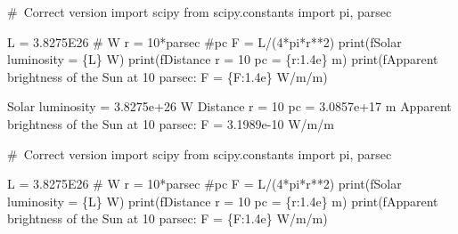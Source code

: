 \documentclass[
  letterpaper,
  DIV=11,
  numbers=noendperiod]{scrreprt}
\newenvironment{Shaded}{\begin{snugshade}}{\end{snugshade}}
\newcommand{\BuiltInTok}[1]{\textcolor[rgb]{0.00,0.23,0.31}{#1}}
\newcommand{\CommentTok}[1]{\textcolor[rgb]{0.37,0.37,0.37}{#1}}
\newcommand{\DecValTok}[1]{\textcolor[rgb]{0.68,0.00,0.00}{#1}}
\newcommand{\FloatTok}[1]{\textcolor[rgb]{0.68,0.00,0.00}{#1}}
\newcommand{\ImportTok}[1]{\textcolor[rgb]{0.00,0.46,0.62}{#1}}
\newcommand{\NormalTok}[1]{\textcolor[rgb]{0.00,0.23,0.31}{#1}}
\newcommand{\OperatorTok}[1]{\textcolor[rgb]{0.37,0.37,0.37}{#1}}
\newcommand{\SpecialCharTok}[1]{\textcolor[rgb]{0.37,0.37,0.37}{#1}}
\newcommand{\SpecialStringTok}[1]{\textcolor[rgb]{0.13,0.47,0.30}{#1}}
\begin{document}
\begin{Shaded}
\begin{Highlighting}[]
\CommentTok{\# Correct version}
\ImportTok{import}\NormalTok{ scipy}
\ImportTok{from}\NormalTok{ scipy.constants }\ImportTok{import}\NormalTok{ pi, parsec}

\NormalTok{L }\OperatorTok{=} \FloatTok{3.8275E26} \CommentTok{\# W}
\NormalTok{r }\OperatorTok{=} \DecValTok{10}\OperatorTok{*}\NormalTok{parsec }\CommentTok{\#pc}
\NormalTok{F }\OperatorTok{=}\NormalTok{ L}\OperatorTok{/}\NormalTok{(}\DecValTok{4}\OperatorTok{*}\NormalTok{pi}\OperatorTok{*}\NormalTok{r}\OperatorTok{**}\DecValTok{2}\NormalTok{)}
\BuiltInTok{print}\NormalTok{(}\SpecialStringTok{f\textquotesingle{}Solar luminosity = }\SpecialCharTok{\{}\NormalTok{L}\SpecialCharTok{\}}\SpecialStringTok{ W\textquotesingle{}}\NormalTok{)}
\BuiltInTok{print}\NormalTok{(}\SpecialStringTok{f\textquotesingle{}Distance r = 10 pc = }\SpecialCharTok{\{}\NormalTok{r}\SpecialCharTok{:1.4e\}}\SpecialStringTok{ m\textquotesingle{}}\NormalTok{)}
\BuiltInTok{print}\NormalTok{(}\SpecialStringTok{f\textquotesingle{}Apparent brightness of the Sun at 10 parsec: F = }\SpecialCharTok{\{}\NormalTok{F}\SpecialCharTok{:1.4e\}}\SpecialStringTok{ W/m/m\textquotesingle{}}\NormalTok{)}

\NormalTok{Solar luminosity }\OperatorTok{=} \FloatTok{3.8275e+26}\NormalTok{ W}
\NormalTok{Distance r }\OperatorTok{=} \DecValTok{10}\NormalTok{ pc }\OperatorTok{=} \FloatTok{3.0857e+17}\NormalTok{ m}
\NormalTok{Apparent brightness of the Sun at }\DecValTok{10}\NormalTok{ parsec: F }\OperatorTok{=} \FloatTok{3.1989e{-}10}\NormalTok{ W}\OperatorTok{/}\NormalTok{m}\OperatorTok{/}\NormalTok{m}
\end{Highlighting}
\end{Shaded}

\begin{Shaded}
\begin{Highlighting}[]
\CommentTok{\# Correct version}
\ImportTok{import}\NormalTok{ scipy}
\ImportTok{from}\NormalTok{ scipy.constants }\ImportTok{import}\NormalTok{ pi, parsec}

\NormalTok{L }\OperatorTok{=} \FloatTok{3.8275E26} \CommentTok{\# W}
\NormalTok{r }\OperatorTok{=} \DecValTok{10}\OperatorTok{*}\NormalTok{parsec }\CommentTok{\#pc}
\NormalTok{F }\OperatorTok{=}\NormalTok{ L}\OperatorTok{/}\NormalTok{(}\DecValTok{4}\OperatorTok{*}\NormalTok{pi}\OperatorTok{*}\NormalTok{r}\OperatorTok{**}\DecValTok{2}\NormalTok{)}
\BuiltInTok{print}\NormalTok{(}\SpecialStringTok{f\textquotesingle{}Solar luminosity = }\SpecialCharTok{\{}\NormalTok{L}\SpecialCharTok{\}}\SpecialStringTok{ W\textquotesingle{}}\NormalTok{)}
\BuiltInTok{print}\NormalTok{(}\SpecialStringTok{f\textquotesingle{}Distance r = 10 pc = }\SpecialCharTok{\{}\NormalTok{r}\SpecialCharTok{:1.4e\}}\SpecialStringTok{ m\textquotesingle{}}\NormalTok{)}
\BuiltInTok{print}\NormalTok{(}\SpecialStringTok{f\textquotesingle{}Apparent brightness of the Sun at 10 parsec: F = }\SpecialCharTok{\{}\NormalTok{F}\SpecialCharTok{:1.4e\}}\SpecialStringTok{ W/m/m\textquotesingle{}}\NormalTok{)}
\end{Highlighting}
\end{Shaded}
\end{document}
